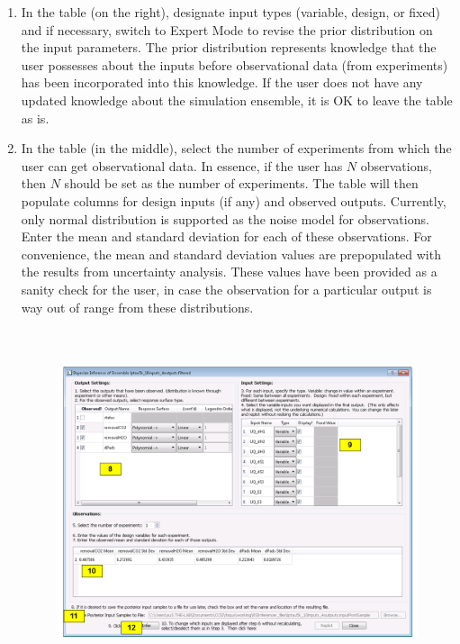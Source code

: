 \begin{enumerate}
{  The user
  can experiment with using different response surface models (for example,
  linear polynomials) to approximate the mapping from inputs to each of the
  outputs. }
\item{In the  table (on the right), 
  designate input types (variable, design, or fixed) and if necessary,
  switch to Expert Mode to revise the prior distribution on the input parameters.
  The prior distribution represents knowledge that the user possesses about
  the inputs before observational data (from experiments) has been
  incorporated into this knowledge. If the user does not have any updated
  knowledge about the simulation ensemble, it is OK to leave the table as is.}  
\item{In the  table (in the middle), select the number of
  experiments from which the user can get observational data. In essence, if the user
  has $N$ observations, then $N$ should be set as the number of
  experiments. The table will then populate columns for design inputs (if
  any) and observed outputs. Currently, only normal distribution is
  supported as the noise model for observations. Enter the mean and standard deviation for each of these observations.
  For convenience,
  the mean and standard deviation values are prepopulated with the results from uncertainty analysis. These
  values have been provided as a sanity check for the user, in case the
  observation for a particular output is way out of range from these
  distributions.
\begin{figure}[H]
\centering \includegraphics[width=6.5in,height=4in,keepaspectratio]{Chapt_uq/figs/tutorial/30_InfScreen2}

\end{figure}}
\end{enumerate}
